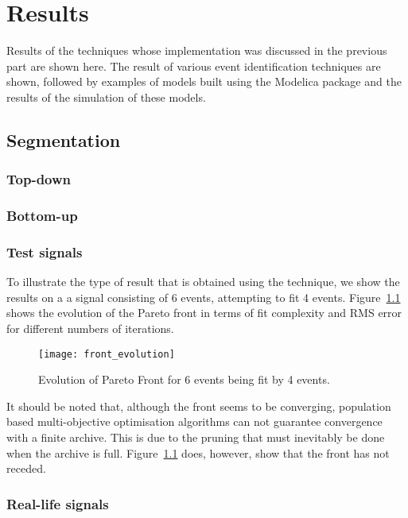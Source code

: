 \chapter{Results}\label{chap:results}
\begin{overview}
  Results of the techniques whose implementation was discussed in the
  previous part are shown here.  The result of various event
  identification techniques are shown, followed by examples of models
  built using the Modelica package and the results of the simulation of these models.
\end{overview}

\section{Segmentation}\label{sec:res:segmentation}
\subsection{Top-down}

\subsection{Bottom-up}

\subsection{Test signals}
To illustrate the type of result that is obtained using the technique,
we show the results on a a signal consisting of 6 events, attempting
to fit 4 events.  Figure~\ref{fig:front_evolution} shows the evolution
of the Pareto front in terms of fit complexity and RMS error for
different numbers of iterations.

\begin{figure}[htbp]
  \centering
  \texttt{[image: front\_evolution]}
  \caption{Evolution of Pareto Front for 6 events being fit by 4 events.}
  \label{fig:front_evolution}
\end{figure}

It should be noted that, although the front seems to be converging,
population based multi-objective optimisation algorithms can not
guarantee convergence with a finite archive.  This is due to the
pruning that must inevitably be done when the archive is full.
Figure~\ref{fig:front_evolution} does, however, show that the front has not
receded.

\subsection{Real-life signals}


